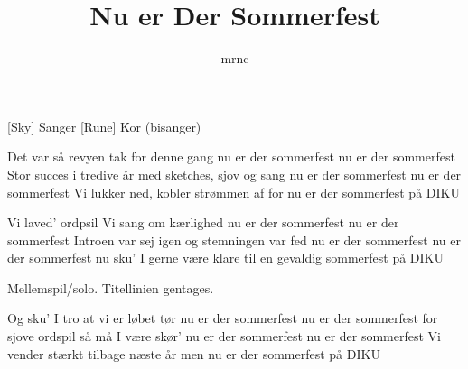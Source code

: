 \documentclass[a4paper,11pt]{article}
\title{Nu er Der Sommerfest}
\author{mrnc}
\begin{document}
\maketitle

\begin{roles}
  [Sky] Sanger
  [Rune] Kor (bisanger)
\end{roles}

\begin{props}
\end{props}

\begin{song}

   Det var så revyen
            tak for denne gang
   nu er der sommerfest
              nu er der sommerfest
   Stor succes i tredive år
            med sketches, sjov og sang
   nu er der sommerfest
              nu er der sommerfest
   Vi lukker ned, kobler strømmen af
            for nu er der sommerfest på DIKU


   Vi laved' ordpsil
            Vi sang om kærlighed
   nu er der sommerfest
              nu er der sommerfest
   Introen var sej igen
            og stemningen var fed
   nu er der sommerfest
              nu er der sommerfest
   nu sku' I gerne være klare til
            en gevaldig sommerfest på DIKU


\scene Mellemspil/solo. Titellinien gentages.


   Og sku' I tro
            at vi er løbet tør
   nu er der sommerfest
              nu er der sommerfest
   for sjove ordspil
            så må I være skør'
   nu er der sommerfest
              nu er der sommerfest
   Vi vender stærkt tilbage næste år
            men nu er der sommerfest på DIKU


\end{song}
\end{document}
